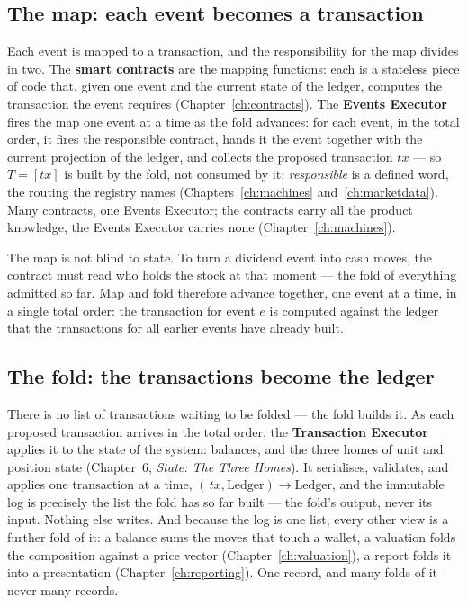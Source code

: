 \subsection{The map: each event becomes a transaction}

Each event is mapped to a transaction, and the responsibility for the map divides in two.
The \textbf{smart contracts} are the mapping functions: each is a stateless piece of code
that, given one event and the current state of the ledger, computes the transaction the
event requires (Chapter~\ref{ch:contracts}). The \textbf{Events Executor} fires the map
one event at a time as the fold advances: for each event, in the total order, it fires the
responsible contract, hands it the event together with the current projection of the
ledger, and collects the proposed transaction $tx$ --- so $T=[tx]$ is built by the fold,
not consumed by it; \emph{responsible} is a defined word, the routing the registry names
(Chapters~\ref{ch:machines} and~\ref{ch:marketdata}). Many contracts, one Events Executor; the contracts carry all the
product knowledge, the Events Executor carries none (Chapter~\ref{ch:machines}).

The map is not blind to state. To turn a dividend event into cash moves, the contract
must read who holds the stock at that moment --- the fold of everything admitted so far.
Map and fold therefore advance together, one event at a time, in a single total order:
the transaction for event $e$ is computed against the ledger that the transactions for
all earlier events have already built.

\subsection{The fold: the transactions become the ledger}

There is no list of transactions waiting to be folded --- the fold builds it. As each
proposed transaction arrives in the total order, the \textbf{Transaction Executor} applies
it to the state of the system: balances, and the three homes of unit and position state
(Chapter~6, \emph{State: The Three Homes}). It serialises, validates, and applies one
transaction at a time, $(\,tx, \mathrm{Ledger}) \to \mathrm{Ledger}$, and the immutable log
is precisely the list the fold has so far built --- the fold's output, never its input.
Nothing else writes. And because the log is one list, every other view is a further fold of it: a
balance sums the moves that touch a wallet, a valuation folds the composition against a
price vector (Chapter~\ref{ch:valuation}), a report folds it into a presentation
(Chapter~\ref{ch:reporting}). One record, and many folds of it --- never many records.

